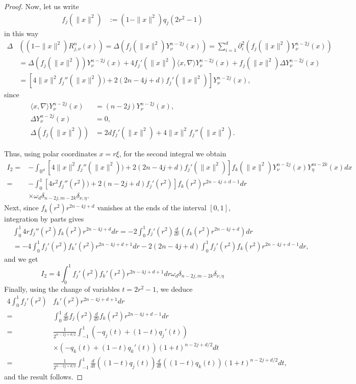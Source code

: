 \documentclass{amsart}
\theoremstyle{plain}%
\theoremstyle{definition}
\theoremstyle{remark}
\begin{document}
\begin{proof}
Now, let us write
\begin{align*}
f_j(\|x\|^2) &:= (1-\|x\|^2)  q_{j}(2 r^2 -1)  
\end{align*}
in this way 
\begin{align*}
\Delta &((1-\|x\|^2)R_{j,\nu}^{n}(x)) = \Delta \left( f_j(\|x\|^2) Y_\nu^{n-2j}(x)\right) = \sum_{i=1}^d \partial_i^2 \left( f_j(\|x\|^2) Y_\nu^{n-2j}(x)\right)\\
&= \Delta (f_j(\|x\|^2)) Y_\nu^{n-2j}(x)+ 4 f_j'(\|x\|^2) \langle  x,\nabla\rangle Y_\nu^{n-2j}(x)
+ f_j(\|x\|^2) \Delta Y_\nu^{n-2j}(x) \\
& = \left[ 4 \|x\|^2 f_j''(\|x\|^2)) + 2(2n-4j + d) f_j'(\|x\|^2)\right] Y_\nu^{n-2j}(x),
\end{align*}
since  
\begin{align*}\langle x,\nabla\rangle Y_\nu^{n-2j}(x) &= (n-2j) Y_\nu^{n-2j}(x),\\
\Delta Y_\nu^{n-2j}(x) &= 0,\\
\Delta (f_j(\|x\|^2)) &= 2 d f_j'(\|x\|^2) + 4 \|x\|^2 f_j''(\|x\|^2).
\end{align*}

Thus, using polar coordinates $ x = r \xi$, for the second integral we obtain 
\begin{align*}
I_2 =& - \int_{\mathbb{B}^d} \left[ 4 \|x\|^2 f_j''(\|x\|^2)) + 2(2n-4j + d) f_j'(\|x\|^2)\right] f_k(\|x\|^2) Y_\nu^{n-2j}(x) Y_\eta^{m-2k}(x)dx\\
=& - \int_0^1 \left[ 4 r^2 f_j''(r^2)) + 2(n-2j + d) f_j'(r^2)\right] f_k(r^2) r^{2n-4j+d-1} dr \\
&\times \omega_d \delta_{n-2j,m-2k} \delta_{\nu,\eta}.
\end{align*}
Next, since \(f_k(r^2) r^{2n-4j+d}\) vanishes at the ends of the interval \([0,1]\), integration by parts gives
\begin{align*}
&\int_0^1 4 r f_j''(r^2) f_k(r^2) r^{2n-4j+d} dr =
- 2 \int_0^1  f_j'(r^2) \frac{d}{dr}\left(f_k(r^2) r^{2n-4j+d}\right) dr \\
&= - 4 \int_0^1  f_j'(r^2) f_k'(r^2) r^{2n-4j+d+1} dr  -
2(2n-4j+d) \int_0^1  f_j'(r^2) f_k(r^2) r^{2n-4j+d-1} dr,
\end{align*}
and we get
\[
I_2 = 4 \int_0^1  f_j'(r^2) f_k'(r^2) r^{2n-4j+d+1} dr \omega_d \delta_{n-2j,m-2k} \delta_{\nu,\eta}
\]
Finally, using the change of variables \( t = 2 r^2 -1\), we deduce
\begin{align*}
 4 \int_0^1  f_j'(r^2)& f_k'(r^2) r^{2n-4j+d+1} dr \\
=& \int_0^1 \frac{d}{dr}f_j(r^2) \frac{d}{dr}f_k(r^2)r^{2n-4j+d-1} dr \\
=& \frac{1}{2^{n-2j+d/2}} \int_{-1}^1 \left(- q_j(t) +  (1-t)q_j'(t)\right) \\
& \times \left(- q_k(t) +  (1-t)q_k'(t)\right) (1+t)^{n-2j+d/2} dt \\
=& \frac{1}{2^{n-2j+d/2}} \int_{-1}^1 \frac{d}{dt}\left((1-t)q_j(t)\right) \frac{d}{dt}\left((1-t)q_k(t)\right) (1+t)^{n-2j+d/2} dt,
\end{align*}
and the result follows.
\end{proof}
\end{document}
